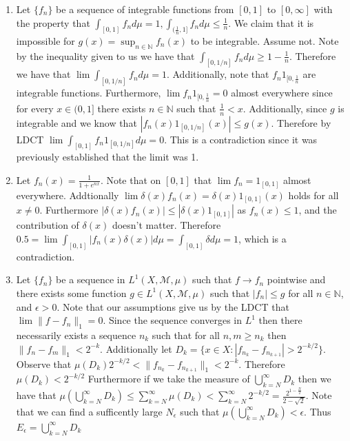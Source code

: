 \documentclass[12pt, letterpaper]{article}
\newcommand{\N}{\mathbb{N}}
\newcommand{\R}{\mathbb{R}}
\begin{document}
\begin{enumerate}
	then by the LDCT we have that 
	$\int_\R f'(x) d \mu = \lim_{n \to \infty} \int_R |f_n(x)| d \mu$.  Note that 
	since $f'$ is non-zero on a countable set, then necessarily $\int_\R f'(x) = 0$.
	Thus $\lim_{n \to \infty} \int_R f_n(x) = 0$.
	\item Let $\{f_n\}$ be a sequence of integrable functions from $[0,1]$ to $[0,\infty]$ with the property that
	$\int_{[0,1]} f_n d \mu = 1, \int_{(\frac{1}{n}, 1]} f_n d \mu \leq \frac{1}{n}$.  We claim that it is impossible
	for $g(x) = \sup_{n \in \N} f_n(x)$ to be integrable.  Assume not.  Note by the inequality given to us we have 
	that $\int_{[0,1/n]} f_n d \mu \geq 1 - \frac{1}{n}$.  Therefore we have that $\lim \int_{[0,1/n]} f_n d \mu = 1$.
	Additionally, note that $f_n 1_{[0,\frac{1}{n}}$ are integrable functions.  Furthermore, $\lim f_n 1_{[0,\frac{1}{n}} = 0$ almost everywhere since for every $x \in (0,1]$ there exists $n\in \N$ such that $\frac{1}{n} < x$.  Additionally,
	since $g$ is integrable and we know that $|f_n(x) 1_{[0,1/n]}(x)| \leq g(x)$.  Therefore by LDCT 
	$\lim \int_{[0,1]} f_n 1_{[0,1/n]} d \mu = 0$.  This is a contradiction since it was previously established 
	that the limit was 1.
	\item Let  $f_n(x) = \frac{1}{1+e^{nx}}$.  Note that on $[0,1]$ that $\lim f_n = 1_{[0,1]}$ almost everywhere.  
	Addtionally $\lim \delta(x) f_n(x) = \delta(x)1_{[0,1]}(x)$ holds for all $x \neq 0$.  Furthermore 
	$|\delta(x) f_n(x)| \leq |\delta(x)1_{[0,1]}|$ as $f_n(x) \leq 1$, and the contribution of $\delta(x)$ doesn't matter.
	Therefore $0.5 = \lim \int_{[0,1]} |f_n(x) \delta(x)| d\mu = \int_{[0,1]} \delta  d \mu = 1$, which is a 
	contradiction.
	\item Let $\{f_n\}$ be a sequence in $L^1(X,\mathcal{M},\mu)$ such that $f \to f_n$ pointwise and there exists 
	some function $g \in L^1(X,\mathcal{M},\mu)$ such that $|f_n| \leq g$ for all $n \in \N$, and $\epsilon > 0$.
	Note that our assumptions give us by the LDCT that $\lim \|f - f_n\|_1 = 0$.  Since the sequence converges in 
	$L^1$ then there necessarily exists a sequence $n_k$ such that for all $n,m \geq n_k$ then 
	$\|f_n - f_m\|_1 < 2^{-k}$.  Additionally let $D_k = \{x \in X: |f_{n_k} - f_{n_{k+1}}| > 2^{-k/2}\}$.
	Observe that $\mu(D_k)2^{-k/2} < \|f_{n_k} - f_{n_{k+1}}\|_1 < 2^{-k}$.  Therefore $\mu(D_k) < 2^{-k/2}$
	Furthermore if we take the measure of $\bigcup_{k=N}^\infty D_k$ then we have that
	$\mu(\bigcup_{k=N}^\infty D_k) \leq \sum_{k=N}^\infty \mu(D_k) < \sum_{k=N}^\infty 2^{-k/2} = \frac{2^{1 - \frac{N}{2}}}{2 - \sqrt{2}}$.  Note that we can find a sufficently large $N_\epsilon$ such that $\mu(\bigcup_{k=N}^\infty D_k)< \epsilon$.
	Thus $E_\epsilon =\bigcup_{k=N}^\infty D_k $
		

\end{enumerate}
\end{document}
